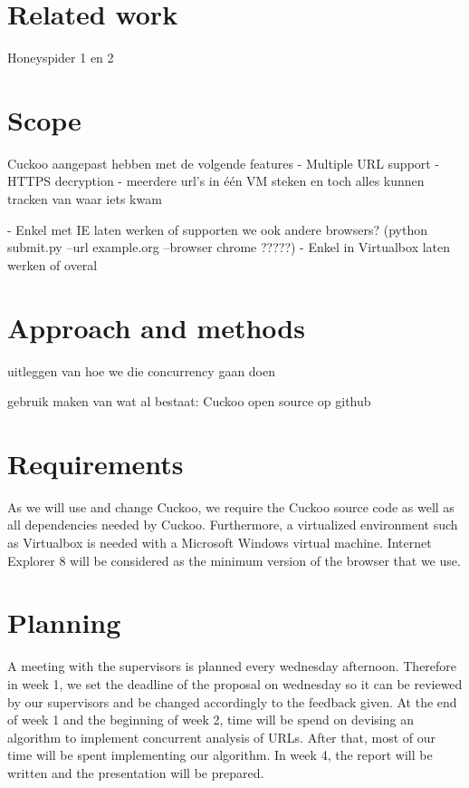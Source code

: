 \documentclass{scrartcl}
\begin{document}
\section{Related work}



Honeyspider 1 en 2

\section{Scope}

	Cuckoo aangepast hebben met de volgende features
		- Multiple URL support
		- HTTPS decryption
		- meerdere url's in één VM steken en toch alles kunnen tracken van waar iets kwam


 - Enkel met IE laten werken of supporten we ook andere browsers?
	(python submit.py --url example.org --browser chrome ?????)
 - Enkel in Virtualbox laten werken of overal


\section{Approach and methods}

uitleggen van hoe we die concurrency gaan doen

gebruik maken van wat al bestaat: Cuckoo
open source op github


\section{Requirements}

As we will use and change Cuckoo, we require the Cuckoo source code as well as all dependencies needed by Cuckoo. Furthermore, a virtualized environment such as Virtualbox is needed with a Microsoft Windows virtual machine. Internet Explorer 8 will be considered as the minimum version of the browser that we use.

\section{Planning}

A meeting with the supervisors is planned every wednesday afternoon. Therefore in week 1, we set the deadline of the proposal on wednesday so it can be reviewed by our supervisors and be changed accordingly to the feedback given. At the end of week 1 and the beginning of week 2, time will be spend on devising an algorithm to implement concurrent analysis of URLs. After that, most of our time will be spent implementing our algorithm. In week 4, the report will be written and the presentation will be prepared.
\end{document}
